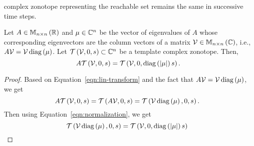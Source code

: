 complex zonotope representing the reachable set remains the same in
successive time steps.
%
\begin{lemma}
Let $A\in\mat{n}{n}{\reals}$ and $\mu\in\compnums^n$ be the vector of
eigenvalues of $A$ whose corresponding eigenvectors are the column
vectors of a matrix $\ptemp\in\mat{n}{n}{\compnums}$, i.e.,
$A\ptemp=\ptemp\diagonal{\mu}$.  Let
$\tcztope{\ptemp}{0}{\sfact}\subset\compnums^n$ be a template complex
zonotope.  Then,
%
\begin{equation}~\label{eqn:eigen-scaling}
A\tcztope{\ptemp}{0}{\sfact}=\tcztope{\ptemp}{0}{\diagonal{\absolute{\mu}}\sfact}.
\end{equation}
%
\end{lemma}
%
\begin{proof}
Based on Equation~\ref{eqn:lin-transform} and the fact that
$A\ptemp=\ptemp\diagonal{\mu}$, we get
%
\[
A\tcztope{\ptemp}{0}{\sfact}=\tcztope{A\ptemp}{0}{\sfact}=\tcztope{\ptemp\diagonal{\mu}}{0}{\sfact}.
\]
%
Then using Equation~\ref{eqn:normalization}, we get
%
\[
\tcztope{\ptemp\diagonal{\mu}}{0}{\sfact}=\tcztope{\ptemp}{0}{\diagonal{\absolute{\mu}}\sfact}
\]
\end{proof}

